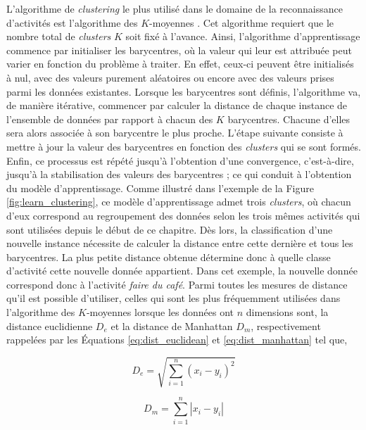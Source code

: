 L'algorithme de \textit{clustering} le plus utilisé dans le domaine de la reconnaissance d'activités est l'algorithme des $K$-moyennes \citep{Messing2009, Kovashka2010}. Cet algorithme requiert que le nombre total de \textit{clusters} $K$ soit fixé à l'avance. Ainsi, l'algorithme d'apprentissage commence par initialiser les barycentres, où la valeur qui leur est attribuée peut varier en fonction du problème à traiter. En effet, ceux-ci peuvent être initialisés à nul, avec des valeurs purement aléatoires ou encore avec des valeurs prises parmi les données existantes. Lorsque les barycentres sont définis, l'algorithme va, de manière itérative, commencer par calculer la distance de chaque instance de l'ensemble de données par rapport à chacun des $K$ barycentres. Chacune d'elles sera alors associée à son barycentre le plus proche. L'étape suivante consiste à mettre à jour la valeur des barycentres en fonction des \textit{clusters} qui se sont formés. Enfin, ce processus est répété jusqu'à l'obtention d'une convergence, c'est-à-dire, jusqu'à la stabilisation des valeurs des barycentres ; ce qui conduit à l'obtention du modèle d'apprentissage. Comme illustré dans l'exemple de la Figure \ref{fig:learn_clustering}, ce modèle d'apprentissage admet trois \textit{clusters}, où chacun d'eux correspond au regroupement des données selon les trois mêmes activités qui sont utilisées depuis le début de ce chapitre. Dès lors, la classification d'une nouvelle instance nécessite de calculer la distance entre cette dernière et tous les barycentres. La plus petite distance obtenue détermine donc à quelle classe d'activité cette nouvelle donnée appartient. Dans cet exemple, la nouvelle donnée correspond donc à l'activité \og \textit{faire du café}\fg. Parmi toutes les mesures de distance qu'il est possible d'utiliser, celles qui sont les plus fréquemment utilisées dans l'algorithme des $K$-moyennes lorsque les données ont $n$ dimensions sont, la distance euclidienne $D_e$ et la distance de Manhattan $D_m$, respectivement rappelées par les Équations \ref{eq:dist_euclidean} et \ref{eq:dist_manhattan} tel que,

\begin{equation}
	\label{eq:dist_euclidean}
	D_e = \sqrt{\sum_{i=1}^{n}(x_i-y_i)^2}
\end{equation}

\begin{equation}
	\label{eq:dist_manhattan}
	D_m = \sum_{i=1}^{n}\left|x_i-y_i\right|
\end{equation}

